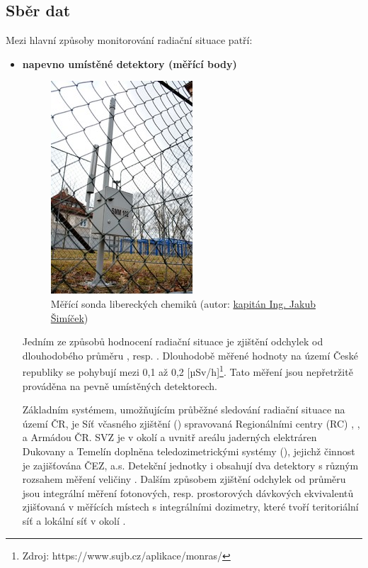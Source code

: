 

\subsection{Sběr dat}	

Mezi hlavní způsoby monitorování radiační situace patří:

\begin{itemize}
\item \textbf{napevno umístěné detektory (měřící body)}
	
\begin{figure}[H]
    \centering
      \includegraphics[width=150pt]{./pictures/03_merici-sonda-v-libereckych-kasarnach_2.jpg}
      \caption[Měřící sonda libereckých chemiků]{Měřící sonda libereckých chemiků
      (autor: \href{http://www.acr.army.cz/informacni-servis/zpravodajstvi/armadni-radiacni-monitorovaci-site-nacvicoval-zasah-pri-radiaci-131355/}{kapitán Ing. Jakub Šimíček})}
      \label{fig:sonda}
\end{figure}
	
Jedním ze způsobů hodnocení radiační situace je zjištění odchylek od
dlouhodobého průměru , resp. . Dlouhodobě měřené
hodnoty  na území České republiky se pohybují mezi 0,1 až 0,2
{[}µSv/h{]}\footnote{Zdroj:
  https://www.sujb.cz/aplikace/monras/}. Tato měření jsou nepřetržitě
prováděna na pevně umístěných detektorech.
	
Základním systémem, umožňujícím průběžné sledování radiační situace na
území ČR, je Síť včasného zjištění () spravovaná Regionálními
centry (RC) , ,  a Armádou ČR. SVZ je v
okolí a uvnitř areálu jaderných elektráren Dukovany a Temelín doplněna
teledozimetrickými systémy (), jejichž činnost je zajišťována
ČEZ, a.s. Detekční jednotky  i  obsahují dva detektory
s různým rozsahem měření veličiny . Dalším způsobem zjištění
odchylek od průměru jsou integrální měření fotonových,
resp. prostorových dávkových ekvivalentů zjišťovaná v měřících místech
s integrálními dozimetry, které tvoří teritoriální síť a lokální síť v
okolí .
	

\end{itemize}
